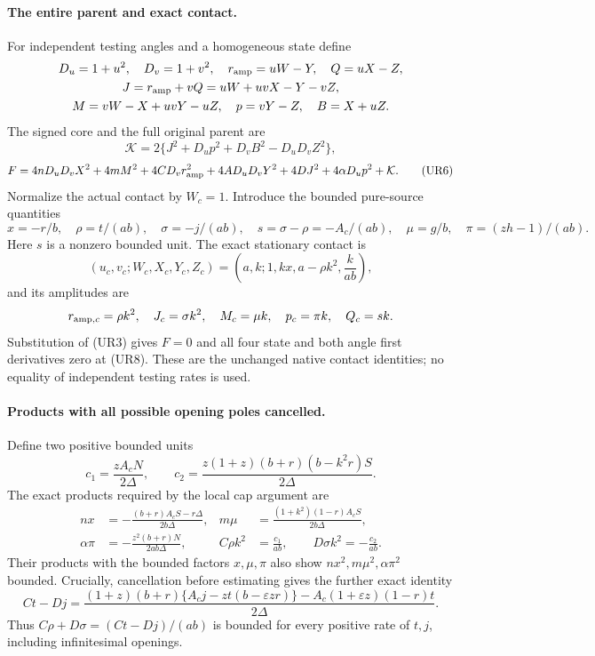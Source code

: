 \paragraph{The entire parent and exact contact.}
For independent testing angles and a homogeneous state define
\[
 \begin{gathered}
 D_u=1+u^2,\quad D_v=1+v^2,\quad
 r_{\rm amp}=uW-Y,\quad Q=uX-Z,\\
 J=r_{\rm amp}+vQ=uW+uvX-Y-vZ,\\
 M=vW-X+uvY-uZ,\quad p=vY-Z,\quad B=X+uZ.
 \end{gathered}
\]
The signed core and the full original parent are
\[
 \mathcal K=2\{J^2+D_up^2+D_vB^2-D_uD_vZ^2\},
\]
\[
 F=4nD_uD_vX^2+4mM^2+4CD_vr_{\rm amp}^2
       +4AD_uD_vY^2+4DJ^2+4\alpha D_up^2+\mathcal K.
 \tag{UR6}\label{pc3daa35e9a9b:eq:ui-full-parent}
\]
Normalize the actual contact by $W_c=1$. Introduce the bounded pure-source
quantities
\[
 x=-r/b,\quad \rho=t/(ab),\quad \sigma=-j/(ab),\quad
 s=\sigma-\rho=-A_c/(ab),\quad
 \mu=g/b,\quad \pi=(zh-1)/(ab).                       \tag{UR7}
 \label{pc3daa35e9a9b:eq:ui-contact-amplitudes}
\]
Here $s$ is a nonzero bounded unit. The exact stationary contact is
\[
 (u_c,v_c;W_c,X_c,Y_c,Z_c)
 =\left(a,k;1,kx,a-\rho k^2,\frac{k}{ab}\right),       \tag{UR8}
\]
and its amplitudes are
\[
 r_{{\rm amp},c}=\rho k^2,\quad J_c=\sigma k^2,\quad
 M_c=\mu k,\quad p_c=\pi k,\quad Q_c=sk.
\]
Substitution of (UR3) gives $F=0$ and all four state and both angle
first derivatives zero at (UR8). These are the unchanged native
contact identities; no equality of independent testing rates is used.

\paragraph{Products with all possible opening poles cancelled.}
Define two positive bounded units
\[
 c_1=\frac{zA_cN}{2\Delta},\qquad
 c_2=\frac{z(1+z)(b+r)(b-k^2r)S}{2\Delta}.
\]
The exact products required by the local cap argument are
\[
 \begin{aligned}
 nx&=-\frac{(b+r)A_cS-r\Delta}{2b\Delta},&
 m\mu&=\frac{(1+k^2)(1-r)A_cS}{2b\Delta},\\
 \alpha\pi&=-\frac{z^2(b+r)N}{2ab\Delta},&
 C\rho k^2&=\frac{c_1}{ab},\qquad
 D\sigma k^2=-\frac{c_2}{ab}.
 \end{aligned}                                                   \tag{UR9}
 \label{pc3daa35e9a9b:eq:ui-cancelled-products}
\]
Their products with the bounded factors $x,\mu,\pi$ also show
$nx^2,m\mu^2,\alpha\pi^2$ bounded. Crucially, cancellation before
estimating gives the further exact identity
\[
 Ct-Dj=
 \frac{(1+z)(b+r)\{A_cj-zt(b-\varepsilon zr)\}
       -A_c(1+\varepsilon z)(1-r)t}{2\Delta}.          \tag{UR10}
 \label{pc3daa35e9a9b:eq:ui-cancelled-CD-difference}
\]
Thus $C\rho+D\sigma=(Ct-Dj)/(ab)$ is bounded for every positive rate
of $t,j$, including infinitesimal openings.

